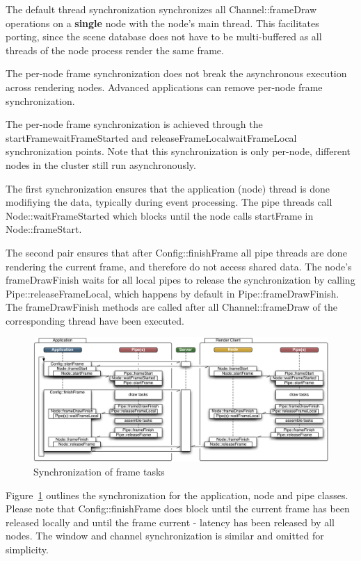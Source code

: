 \documentclass[10pt,a4]{scrartcl}
\newcommand{\fig}[1]{Figure~\ref{#1}}
\begin{document}
The default thread synchronization synchronizes all
\textsf{Channel::frameDraw} operations on a \textbf{single} node with
the node's main thread. This facilitates porting, since the scene
database does not have to be multi-buffered as all threads of the node
process render the same frame.

The per-node frame synchronization does not break the asynchronous
execution across rendering nodes.  Advanced applications can remove per-node
frame synchronization.

The per-node frame synchronization is achieved through the
\textsf{startFrame\textrightarrow wait\-Fra\-me\-Started} and
\textsf{releaseFrameLocal\textrightarrow waitFrameLocal} synchronization
points. Note that this synchronization is only per-node, different nodes
in the cluster still run asynchronously.

The first synchronization ensures that the application (node) thread is
done modifiying the data, typically during event processing. The pipe
threads call \textsf{Node::waitFrameStarted} which blocks until the node
calls \textsf{startFrame} in \textsf{Node::frame\-Start}.

The second pair ensures that after \textsf{Config::finishFrame} all pipe
threads are done rendering the current frame, and therefore do not
access shared data. The node's \textsf{frameDrawFinish} waits for all
local pipes to release the synchronization by calling
\textsf{Pipe::releaseFrameLocal}, which happens by default in
\textsf{Pipe::frameDrawFinish}. The \textsf{frameDrawFinish} methods are
called after all \textsf{Channel::frameDraw} of the corresponding thread
have been executed.

\begin{figure}[ht!]\center
  \includegraphics[width=.9\textwidth]{images/mainloop.pdf}
  {\caption{\small\label{fFrameSync}Synchronization of frame tasks}}
\end{figure}

\fig{fFrameSync} outlines the synchronization for the application, node
and pipe classes. Please note that \textsf{Config::finishFrame} does
block until the current frame has been released locally and until the
frame \textsf{current - latency} has been released by all nodes. The
window and channel synchronization is similar and omitted for
simplicity.
\end{document}

